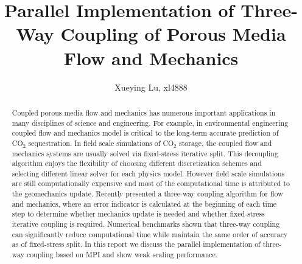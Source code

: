 \documentclass[letterpaper,11pt]{article}
\title{Parallel Implementation of Three-Way Coupling of Porous Media Flow and Mechanics}
\author{Xueying Lu,   xl4888}
\begin{document}
 \maketitle 
\begin{abstract}
Coupled porous media flow and mechanics has numerous important applications in many disciplines of science and engineering. For example, in environmental engineering coupled flow and mechanics model is critical to the long-term accurate prediction of CO$_2$ sequestration. In field scale simulations of CO$_2$ storage, the coupled flow and mechanics systems are usually solved via fixed-stress iterative split. This decoupling algorithm enjoys the flexibility of choosing different discretization schemes and selecting different linear solver for each physics model. However field scale simulations are still computationally expensive and most of the computational time is attributed to the geomechanics update. Recently \citet{lu2019optimal} presented a three-way coupling algorithm for flow and mechanics, where an error indicator is calculated at the beginning of each time step to determine whether mechanics update is needed and whether fixed-stress iterative coupling is required. Numerical benchmarks shown that three-way coupling can significantly reduce computational time while maintain the same order of accuracy as of fixed-stress split. In this report we discuss the parallel implementation of three-way coupling based on MPI and show weak scaling performance.
\end{abstract}
\end{document}
